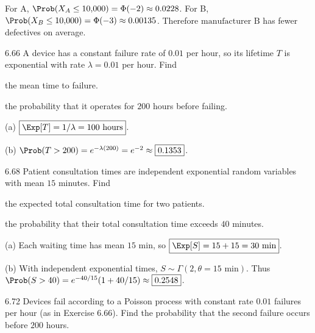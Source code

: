 \documentclass[11pt,oneside]{article}
\begin{document}
\begin{solution}
For A, $\Prob(X_A\le10{,}000)=\Phi(-2)\approx0.0228$. For B, $\Prob(X_B\le10{,}000)=\Phi(-3)\approx0.00135$. Therefore $\boxed{\text{manufacturer B}}$ has fewer defectives on average.
\end{solution}

\begin{exercise}{6.66}
A device has a constant failure rate of $0.01$ per hour, so its lifetime $T$ is exponential with rate $\lambda=0.01$ per hour. Find
\begin{exercisesubparts}
\item the mean time to failure.
\item the probability that it operates for $200$ hours before failing.
\end{exercisesubparts}
\end{exercise}

\begin{solution}
\noindent\textup{(a)} $\boxed{\Exp[T]=1/\lambda=100\text{ hours}}$.

\noindent\textup{(b)} $\Prob(T>200)=e^{-\lambda(200)}=e^{-2}\approx\boxed{0.1353}$.
\end{solution}

\begin{exercise}{6.68}
Patient consultation times are independent exponential random variables with mean $15$ minutes. Find
\begin{exercisesubparts}
\item the expected total consultation time for two patients.
\item the probability that their total consultation time exceeds $40$ minutes.
\end{exercisesubparts}
\end{exercise}

\begin{solution}
\noindent\textup{(a)} Each waiting time has mean $15$ min, so $\boxed{\Exp[S]=15+15=30\text{ min}}$.

\noindent\textup{(b)} With independent exponential times, $S\sim\Gamma(2,\theta=15\text{ min})$. Thus $\Prob(S>40)=e^{-40/15}(1+40/15)\approx\boxed{0.2548}$.
\end{solution}

\begin{exercise}{6.72}
Devices fail according to a Poisson process with constant rate $0.01$ failures per hour (as in Exercise 6.66). Find the probability that the second failure occurs before $200$ hours.
\end{exercise}
\end{document}

